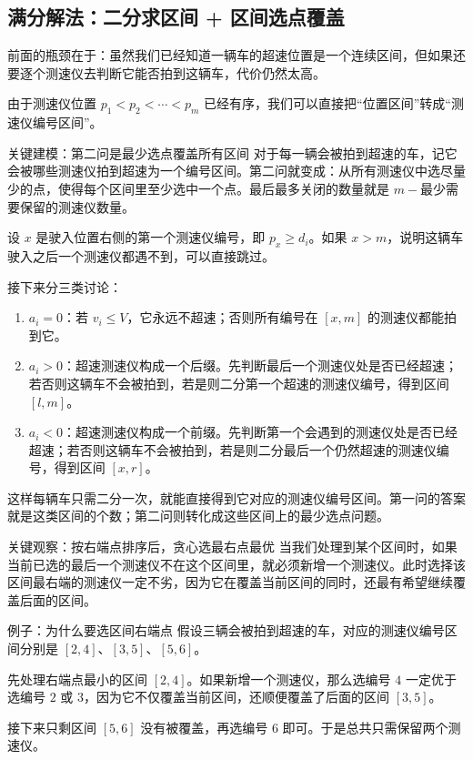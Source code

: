 \documentclass{book}
\begin{document}
    \subsection{满分解法：二分求区间 + 区间选点覆盖}

    前面的瓶颈在于：虽然我们已经知道一辆车的超速位置是一个连续区间，但如果还要逐个测速仪去判断它能否拍到这辆车，代价仍然太高。

    由于测速仪位置 $p_1<p_2<\cdots<p_m$ 已经有序，我们可以直接把“位置区间”转成“测速仪编号区间”。

    \begin{keybox}{关键建模：第二问是最少选点覆盖所有区间}
    对于每一辆会被拍到超速的车，记它会被哪些测速仪拍到超速为一个编号区间。第二问就变成：从所有测速仪中选尽量少的点，使得每个区间里至少选中一个点。最后最多关闭的数量就是 $m-$最少需要保留的测速仪数量。
    \end{keybox}

    设 $x$ 是驶入位置右侧的第一个测速仪编号，即 $p_x\ge d_i$。如果 $x>m$，说明这辆车驶入之后一个测速仪都遇不到，可以直接跳过。

    接下来分三类讨论：

    \begin{enumerate}[leftmargin=2em,itemsep=1pt,topsep=2pt,parsep=0pt,partopsep=0pt]
        \item $a_i=0$：若 $v_i\le V$，它永远不超速；否则所有编号在 $[x,m]$ 的测速仪都能拍到它。
        \item $a_i>0$：超速测速仪构成一个后缀。先判断最后一个测速仪处是否已经超速；若否则这辆车不会被拍到，若是则二分第一个超速的测速仪编号，得到区间 $[l,m]$。
        \item $a_i<0$：超速测速仪构成一个前缀。先判断第一个会遇到的测速仪处是否已经超速；若否则这辆车不会被拍到，若是则二分最后一个仍然超速的测速仪编号，得到区间 $[x,r]$。
    \end{enumerate}

    这样每辆车只需二分一次，就能直接得到它对应的测速仪编号区间。第一问的答案就是这类区间的个数；第二问则转化成这些区间上的最少选点问题。

    \begin{keybox}{关键观察：按右端点排序后，贪心选最右点最优}
    当我们处理到某个区间时，如果当前已选的最后一个测速仪不在这个区间里，就必须新增一个测速仪。此时选择该区间最右端的测速仪一定不劣，因为它在覆盖当前区间的同时，还最有希望继续覆盖后面的区间。
    \end{keybox}

    \begin{examplebox}{例子：为什么要选区间右端点}
    假设三辆会被拍到超速的车，对应的测速仪编号区间分别是 $[2,4]$、$[3,5]$、$[5,6]$。

    先处理右端点最小的区间 $[2,4]$。如果新增一个测速仪，那么选编号 $4$ 一定优于选编号 $2$ 或 $3$，因为它不仅覆盖当前区间，还顺便覆盖了后面的区间 $[3,5]$。

    接下来只剩区间 $[5,6]$ 没有被覆盖，再选编号 $6$ 即可。于是总共只需保留两个测速仪。
    \end{examplebox}
\end{document}
